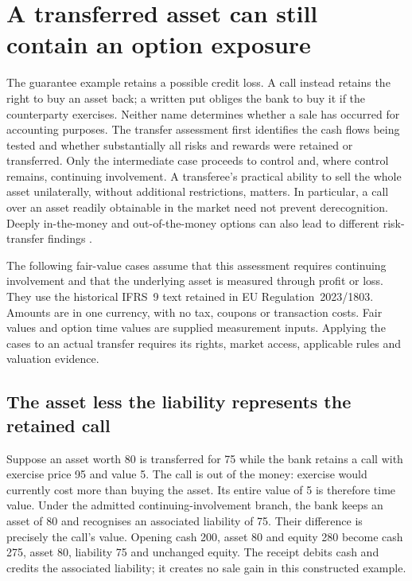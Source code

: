 \section{A transferred asset can still contain an option exposure}
\label{sec:bank-option-transfers}

The guarantee example retains a possible credit loss. A call instead retains
the right to buy an asset back; a written put obliges the bank to buy it if
the counterparty exercises. Neither name determines whether a sale has
occurred for accounting purposes. The transfer assessment first identifies
the cash flows being tested and whether substantially all risks and rewards
were retained or transferred. Only the intermediate case proceeds to control
and, where control remains, continuing involvement. A transferee's practical
ability to sell the whole asset unilaterally, without additional restrictions,
matters. In particular, a call over an asset readily obtainable in the market
need not prevent derecognition. Deeply in-the-money and out-of-the-money
options can also lead to different risk-transfer findings
\citep[IFRS~9.3.2.2--16, B3.2.6--9, B3.2.16]{eu20231803}.

The following fair-value cases assume that this assessment requires continuing
involvement and that the underlying asset is measured through profit or loss.
They use the historical IFRS~9 text retained in EU Regulation~2023/1803.
Amounts are in one currency, with no tax, coupons or transaction costs. Fair
values and option time values are supplied measurement inputs. Applying the
cases to an actual transfer requires its rights, market access, applicable
rules and valuation evidence.

\subsection{The asset less the liability represents the retained call}

Suppose an asset worth 80 is transferred for 75 while the bank retains a call
with exercise price 95 and value 5. The call is out of the money: exercise
would currently cost more than buying the asset. Its entire value of 5 is
therefore time value. Under the admitted continuing-involvement branch,
the bank keeps an asset of 80 and recognises an associated liability of 75.
Their difference is precisely the call's value. Opening cash 200, asset 80
and equity 280 become cash 275, asset 80, liability 75 and unchanged equity.
The receipt debits cash and credits the associated liability; it creates no
sale gain in this constructed example.


